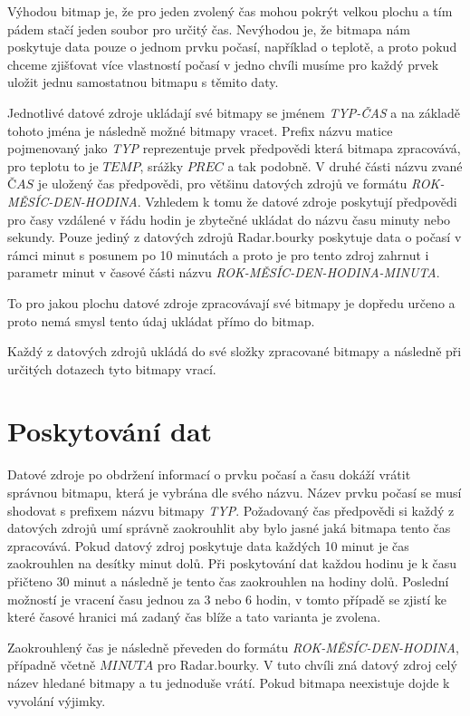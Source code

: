 \documentclass[czech,bachelor,dept460,male,csharp,cpdeclaration]{diploma}
\begin{document}
	Výhodou bitmap je, že pro jeden zvolený čas mohou pokrýt velkou plochu a tím pádem stačí jeden soubor pro určitý čas. Nevýhodou je, že bitmapa nám poskytuje data pouze o jednom prvku počasí, například o teplotě, a proto pokud chceme zjišťovat více vlastností počasí v jedno chvíli musíme pro každý prvek uložit jednu samostatnou bitmapu s těmito daty.
	
	Jednotlivé datové zdroje ukládají své bitmapy se jménem {\it TYP-ČAS} a na základě tohoto jména je následně možné bitmapy vracet. Prefix názvu matice pojmenovaný jako {\it TYP} reprezentuje prvek předpovědi která bitmapa zpracovává, pro teplotu to je $TEMP$, srážky $PREC$ a tak podobně. V druhé části názvu zvané $ČAS$ je uložený čas předpovědi, pro většinu datových zdrojů ve formátu {\it ROK-MĚSÍC-DEN-HODINA}. Vzhledem k tomu že datové zdroje poskytují předpovědi pro časy vzdálené v řádu hodin je zbytečné ukládat do názvu času minuty nebo sekundy. Pouze jediný z datových zdrojů Radar.bourky poskytuje data o počasí v rámci minut s posunem po 10 minutách a proto je pro tento zdroj zahrnut i parametr minut v časové části názvu {\it ROK-MĚSÍC-DEN-HODINA-MINUTA}.
	
	To pro jakou plochu datové zdroje zpracovávají své bitmapy je dopředu určeno a proto nemá smysl tento údaj ukládat přímo do bitmap.
	
	Každý z datových zdrojů ukládá do své složky zpracované bitmapy a následně při určitých dotazech tyto bitmapy vrací. 
	
	\section{Poskytování dat}
	
	Datové zdroje po obdržení informací o prvku počasí a času dokáží vrátit správnou bitmapu, která je vybrána dle svého názvu. Název prvku počasí se musí shodovat s prefixem názvu bitmapy {\it TYP}. Požadovaný čas předpovědi si každý z datových zdrojů umí správně zaokrouhlit aby bylo jasné jaká bitmapa tento čas zpracovává. Pokud datový zdroj poskytuje data každých 10 minut je čas zaokrouhlen na desítky minut dolů. Při poskytování dat každou hodinu je k času přičteno 30 minut a následně je tento čas zaokrouhlen na hodiny dolů. Poslední možností je vracení času jednou za 3 nebo 6 hodin, v tomto případě se zjistí ke které časové hranici má zadaný čas blíže a tato varianta je zvolena.
	
	Zaokrouhlený čas je následně převeden do formátu {\it ROK-MĚSÍC-DEN-HODINA}, případně včetně $MINUTA$ pro Radar.bourky. V tuto chvíli zná datový zdroj celý název hledané bitmapy a tu jednoduše vrátí. Pokud bitmapa neexistuje dojde k vyvolání výjimky.
	
\end{document}
